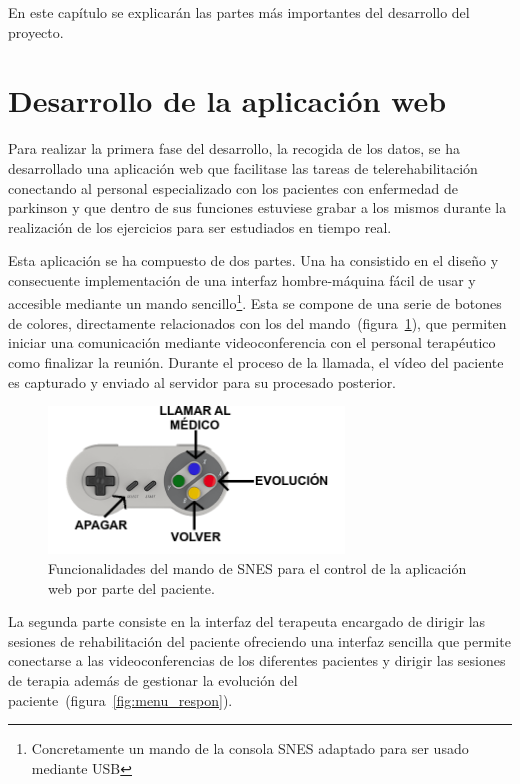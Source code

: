 
En este capítulo se explicarán las partes más importantes del desarrollo del proyecto.

\section{Desarrollo de la aplicación web}

Para realizar la primera fase del desarrollo, la recogida de los datos, se ha desarrollado una aplicación web que facilitase las tareas de telerehabilitación conectando al personal especializado con los pacientes con enfermedad de parkinson y que dentro de sus funciones estuviese grabar a los mismos durante la realización de los ejercicios para ser estudiados en tiempo real.

Esta aplicación se ha compuesto de dos partes. Una ha consistido en el diseño y consecuente implementación de una interfaz hombre-máquina fácil de usar y accesible mediante un mando sencillo\footnote{Concretamente un mando de la consola SNES adaptado para ser usado mediante USB}. Esta se compone de una serie de botones de colores, directamente relacionados con los del mando~(figura~\ref{fig:help}), que permiten iniciar una comunicación mediante videoconferencia con el personal terapéutico como finalizar la reunión. Durante el proceso de la llamada, el vídeo del paciente es capturado y enviado al servidor para su procesado posterior.

\begin{figure}
	\centering
	\includegraphics[width=0.7\textwidth]{img/ayuda.png}
	\caption{Funcionalidades del mando de SNES para el control de la aplicación web por parte del paciente.}
	\label{fig:help}
\end{figure}


La segunda parte consiste en la interfaz del terapeuta encargado de dirigir las sesiones de rehabilitación del paciente ofreciendo una interfaz sencilla que permite conectarse a las videoconferencias de los diferentes pacientes y dirigir las sesiones de terapia además de gestionar la evolución del paciente~(figura~\ref{fig:menu_respon}).

